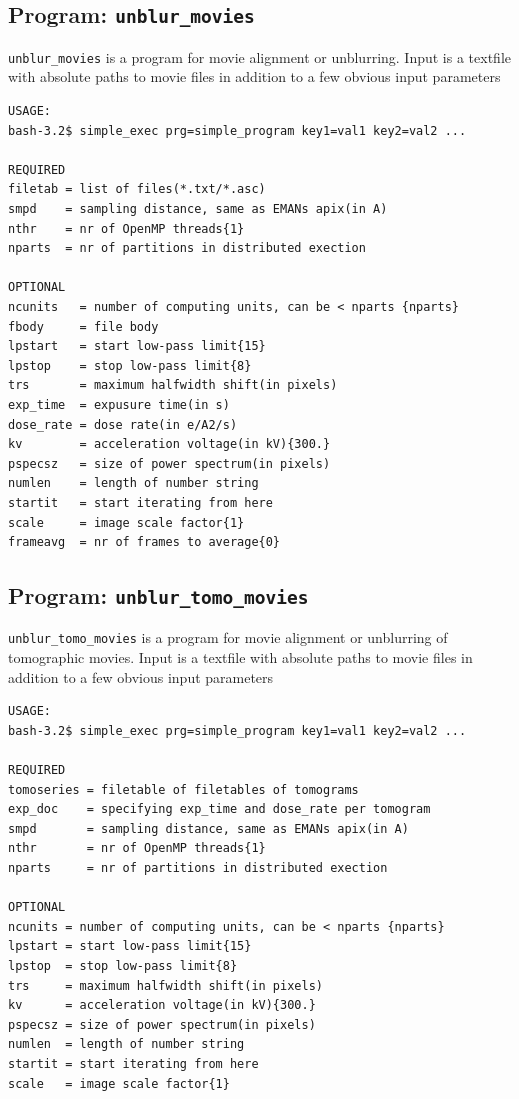 \documentclass[a4paper,11pt]{article}
\newcommand{\prgname}[1]{\textcolor{NavyBlue}{\texttt{#1}}}
\begin{document}
\subsection{Program: \prgname{unblur\_movies}}
\label{unblur_movies}
\prgname{unblur\_movies} is a program for movie alignment or unblurring. Input is a textfile with absolute paths to movie files in addition to a few obvious input parameters

\begin{verbatim}
USAGE:
bash-3.2$ simple_exec prg=simple_program key1=val1 key2=val2 ...

REQUIRED
filetab = list of files(*.txt/*.asc)
smpd    = sampling distance, same as EMANs apix(in A)
nthr    = nr of OpenMP threads{1}
nparts  = nr of partitions in distributed exection

OPTIONAL
ncunits   = number of computing units, can be < nparts {nparts}
fbody     = file body
lpstart   = start low-pass limit{15}
lpstop    = stop low-pass limit{8}
trs       = maximum halfwidth shift(in pixels)
exp_time  = expusure time(in s)
dose_rate = dose rate(in e/A2/s)
kv        = acceleration voltage(in kV){300.}
pspecsz   = size of power spectrum(in pixels)
numlen    = length of number string
startit   = start iterating from here
scale     = image scale factor{1}
frameavg  = nr of frames to average{0}
\end{verbatim}

\subsection{Program: \prgname{unblur\_tomo\_movies}}
\label{unblur_tomo_movies}
\prgname{unblur\_tomo\_movies} is a program for movie alignment or unblurring of tomographic movies. Input is a textfile with absolute paths to movie files in addition to a few obvious input parameters

\begin{verbatim}
USAGE:
bash-3.2$ simple_exec prg=simple_program key1=val1 key2=val2 ...

REQUIRED
tomoseries = filetable of filetables of tomograms
exp_doc    = specifying exp_time and dose_rate per tomogram
smpd       = sampling distance, same as EMANs apix(in A)
nthr       = nr of OpenMP threads{1}
nparts     = nr of partitions in distributed exection

OPTIONAL
ncunits = number of computing units, can be < nparts {nparts}
lpstart = start low-pass limit{15}
lpstop  = stop low-pass limit{8}
trs     = maximum halfwidth shift(in pixels)
kv      = acceleration voltage(in kV){300.}
pspecsz = size of power spectrum(in pixels)
numlen  = length of number string
startit = start iterating from here
scale   = image scale factor{1}
\end{verbatim}



\end{document}
